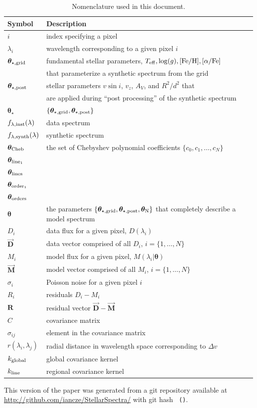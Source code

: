 \documentclass[preprint]{aastex} %
\newcommand{\vt}{ {\bm \theta}}
\newcommand{\vg}{\vt_{\star, {\rm grid}}}
\newcommand{\vpp}{\vt_{\star, {\rm post}}}
\newcommand{\finst}{f_{\lambda, {\rm inst}}}
\newcommand{\fsynth}{f_{\lambda, {\rm synth}}}
\newcommand{\vN}{\vt_{\rm N}}
\newcommand{\vtstar}{\vt_{\star}}
\newcommand{\vtcheb}{\vt_{\rm Cheb}}
\newcommand{\vtorder}[1]{\vt_{{\rm order}_{#1}}}
\newcommand{\vtorders}{\vt_{\rm orders}}
\newcommand{\vtline}[1]{\vt_{{\rm line}_{#1}}}
\newcommand{\vtlines}{\vt_{\rm lines}}
\newcommand{\fM}{ \vec{{\bm M}}}
\newcommand{\fMi}{M_i}
\newcommand{\fD}{ \vec{{\bm D}}}
\newcommand{\fDi}{D_i}
\newcommand{\fR}{ {\bm R}}
\newcommand{\Z}{[{\rm Fe}/{\rm H}]}
\newcommand{\A}{[\alpha/{\rm Fe}]}
\begin{document}
\appendix

\begin{table}[!htb]
\begin{tabular}{ll}
\hline
\hline
Symbol & Description\\
\hline
\hline
$i$ & index specifying a pixel\\
$\lambda_i$ & wavelength corresponding to a given pixel $i$\\
$\vg$ & fundamental stellar parameters, $T_{\rm eff}, \log(g), \Z, \A$\\
  & that parameterize a synthetic spectrum from the grid\\
$\vpp$ & stellar parameters $v \sin i$, $v_z$, $A_V$, and $R^2/d^2$ that\\
  & are applied during ``post processing'' of the synthetic spectrum\\
$\vtstar$ & $\{\vg,\vpp \}$\\
$\finst(\lambda)$ & data spectrum\\
$\fsynth(\lambda)$ & synthetic spectrum\\
$\vtcheb$ & the set of Chebyshev polynomial coefficients $\{c_0, c_1, \ldots, c_N\}$\\
$\vtline{1}$ & \\
$\vtlines$ & \\
$\vtorder{1}$ & \\
$\vtorders$ & \\
$\vt$ & the parameters $\{\vg, \vpp, \vN\}$ that completely describe a model spectrum\\
$\fDi$ & data flux for a given pixel, $D(\lambda_i)$\\
$\fD$ & data vector comprised of all $\fDi$, $i = \{1, \ldots, N\}$\\
$\fMi$ & model flux for a given pixel, $M(\lambda_i | \vt)$\\
$\fM$ & model vector comprised of all $\fMi$, $i = \{1, \ldots, N\}$\\
$\sigma_i$ & Poisson noise for a given pixel $i$\\
$R_i$ & residuals $\fDi - \fMi$\\
$\fR$ & residual vector $\fD - \fM$\\
$C$ & covariance matrix\\
$\sigma_{ij}$ & element in the covariance matrix\\
$r(\lambda_i, \lambda_j)$ & radial distance in wavelength space corresponding to $\Delta v$\\
$k_{\rm global}$ & global covariance kernel\\
$k_{\rm line}$ & regional covariance kernel\\
\hline
\end{tabular}
\caption{Nomenclature used in this document.}
\label{tab:nomenclature}
\end{table}

This version of the paper was generated
 from a git repository available at \url{http://github.com/iancze/StellarSpectra/}
 with git hash \texttt{\githash\,(\gitdate)}.
\end{document}

